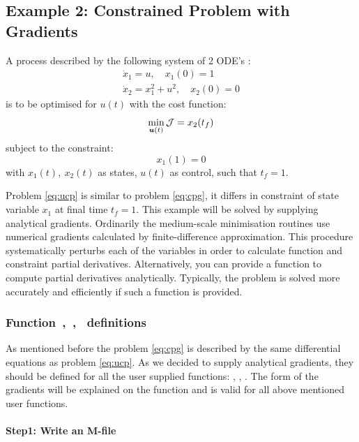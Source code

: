 \subsection{Example 2: Constrained Problem with Gradients}
\label{sec:conprobgrad}

A process described by the following system of 2
ODE's \citep{raj01,luu91}:   
\begin{gather}
\dot{x}_1 = u, \quad x_{1}(0) = 1\\
\dot{x}_2 = x^{2}_{1} + u^{2}, \quad x_{2}(0) = 0
\end{gather} is to be optimised for $u(t)$ with the cost function:
\begin{equation}
\min_{\ve{u}(t)} \mf{J} = x_{2}(t_{f}) \label{eq:cpg} 
\end{equation} subject to the constraint:
\begin{equation}
x_{1}(1) = 0
\end{equation} with $x_{1}(t),~x_{2}(t)$ as states, $u(t)$ as control,
such that $t_{f} = 1$. 

Problem \eqref{eq:ucp} is similar to problem \eqref{eq:cpg}, it 
differs in constraint of state variable $x_{1}$ at final time
$t_{f}=1$. This example will be solved by supplying analytical
gradients. Ordinarily the medium-scale minimisation routines use
numerical gradients calculated by finite-difference
approximation. This procedure systematically perturbs each of the
variables in order to calculate function and constraint partial
derivatives. Alternatively, you can provide a function to compute 
partial derivatives analytically. Typically, the problem is solved
more accurately and efficiently if such a function is provided. 

\subsubsection{Function~,~,~  definitions}
\label{sec:conprobgrad-fundef}

As mentioned before the problem \eqref{eq:cpg} is described by the
same differential equations as problem \eqref{eq:ucp}. As we decided
to supply analytical gradients, they should be defined for all the
user supplied functions: , ,
. The form of the gradients will be explained on the
function  and is valid for all above mentioned user
functions.  

\paragraph{Step1: Write an M-file~}

